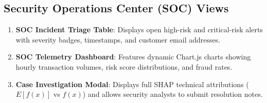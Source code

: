\subsection{Security Operations Center (SOC) Views}
\begin{enumerate}[label=\arabic*.]
    \item \textbf{SOC Incident Triage Table}: Displays open high-risk and critical-risk alerts with severity badges, timestamps, and customer email addresses.
    \item \textbf{SOC Telemetry Dashboard}: Features dynamic Chart.js charts showing hourly transaction volumes, risk score distributions, and fraud rates.
    \item \textbf{Case Investigation Modal}: Displays full SHAP technical attributions ($E[f(x)]$ vs $f(x)$) and allows security analysts to submit resolution notes.
\end{enumerate}
